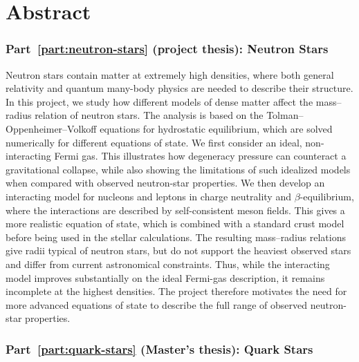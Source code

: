 \chapter{Abstract}

\subsection*{Part~\ref{part:neutron-stars} (project thesis): Neutron Stars}

Neutron stars contain matter at extremely high densities, where both general
relativity and quantum many-body physics are needed to describe their structure.
In this project, we study how different models of dense matter affect the
mass--radius relation of neutron stars. The analysis is based on the
Tolman--Oppenheimer--Volkoff equations for hydrostatic equilibrium, which are
solved numerically for different equations of state.
We first consider an ideal, non-interacting Fermi gas. This illustrates how
degeneracy pressure can counteract a gravitational collapse, while also showing
the limitations of such idealized models when compared with observed
neutron-star properties. We then develop an interacting model for nucleons and
leptons in charge neutrality and \(\beta\)-equilibrium, where the interactions
are described by self-consistent meson fields. This gives a more realistic
equation of state, which is combined with a standard crust model before being
used in the stellar calculations.
The resulting mass--radius relations give radii typical of neutron stars, but
do not support the heaviest observed stars and differ from current astronomical
constraints. Thus, while the interacting model improves substantially on the
ideal Fermi-gas description, it remains incomplete at the highest densities. The
project therefore motivates the need for more advanced equations of state to
describe the full range of observed neutron-star properties.

\subsection*{Part~\ref{part:quark-stars} (Master's thesis): Quark Stars}

